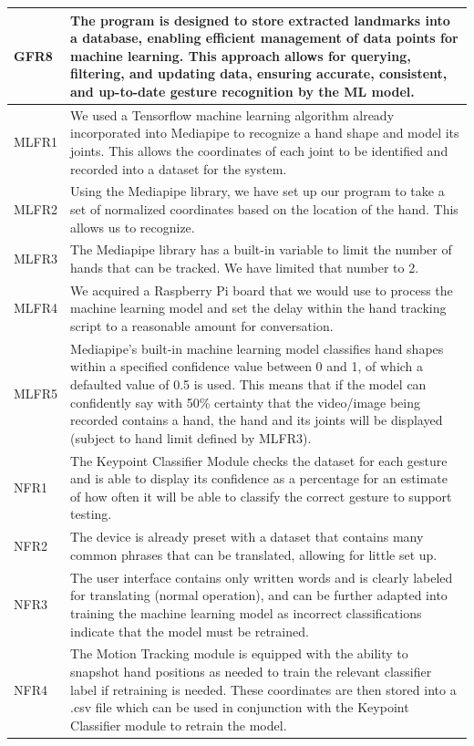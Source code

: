 \documentclass[12pt, titlepage]{article}
\begin{document}
\begin{longtable}{p{}|p{}}
\hline
GFR8
& The program is designed to store extracted landmarks into a database, enabling efficient management of data points for machine learning. This approach allows for querying, filtering, and updating data, ensuring accurate, consistent, and up-to-date gesture recognition by the ML model.\\
\hline
MLFR1
& We used a Tensorflow machine learning algorithm already incorporated into Mediapipe to recognize a hand shape and model its joints. This allows the coordinates of each joint to be identified and recorded into a dataset for the system.\\
\hline
MLFR2
& Using the Mediapipe library, we have set up our program to take a set of normalized coordinates based on the location of the hand. This allows us to recognize.\\
\hline
MLFR3
& The Mediapipe library has a built-in variable to limit the number of hands that can be tracked. We have limited that number to 2.\\
\hline
MLFR4
& We acquired a Raspberry Pi board that we would use to process the machine learning model and set the delay within the hand tracking script to a reasonable amount for conversation.\\
\hline
MLFR5
& Mediapipe’s built-in machine learning model classifies hand shapes within a specified confidence value between 0 and 1, of which a defaulted value of 0.5 is used. This means that if the model can confidently say with 50\% certainty that the video/image being recorded contains a hand, the hand and its joints will be displayed (subject to hand limit defined by MLFR3).\\
\hline
NFR1
& The Keypoint Classifier Module checks the dataset for each gesture and is able to display its confidence as a percentage for an estimate of how often it will be able to classify the correct gesture to support testing.\\
\hline
NFR2
& The device is already preset with a dataset that contains many common phrases that can be translated, allowing for little set up.\\
\hline
NFR3
& The user interface contains only written words and is clearly labeled for translating (normal operation), and can be further adapted into training the machine learning model as incorrect classifications indicate that the model must be retrained.\\
\hline
NFR4
& The Motion Tracking module is equipped with the ability to snapshot hand positions as needed to train the relevant classifier label if retraining is needed. These coordinates are then stored into a .csv file which can be used in conjunction with the Keypoint Classifier module to retrain the model.\\

\end{longtable}
\end{document}
